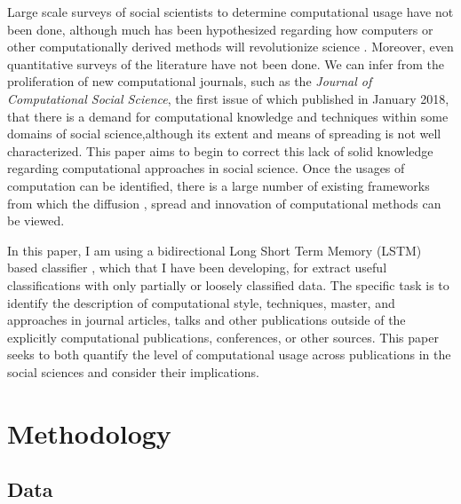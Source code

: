 \documentclass[12pt, a4paper]{article}
\begin{document}
Large scale surveys of social scientists to determine computational usage have not been done, although much has been hypothesized regarding how computers or other computationally derived methods will revolutionize science \citep[e.g.][]{de1997computer, anderson2008end,  provost2013data, john2014big}. Moreover,  even quantitative  surveys  of  the  literature  have  not been  done. We can infer from the proliferation of new computational journals, such as the \textit{Journal of Computational Social Science}, the first issue of which published in January 2018, that there is a demand for computational knowledge and techniques within some  domains  of  social science,although its extent and means of spreading is not well characterized. This paper aims to begin to correct this lack of solid knowledge regarding computational approaches in social  science.  Once the usages of computation can be identified, there is a large number of existing frameworks from which the diffusion \citep{griliches1960hybrid}, spread \citep{padgett1993robust} and innovation \citep{foster2015tradition} of computational methods can be viewed.

In this paper, I am using a bidirectional Long Short Term Memory (LSTM) based classifier \cite{graves2005framewise}, which that I have been developing, for extract useful classifications with only partially or loosely classified data. The specific task is to identify the description of computational style, techniques, master, and approaches in journal articles, talks and other publications outside of the explicitly computational publications, conferences, or other sources. This paper seeks to both quantify the level of computational usage across publications in the social sciences and consider their implications.


\section{Methodology}

\subsection{Data}
\end{document}
